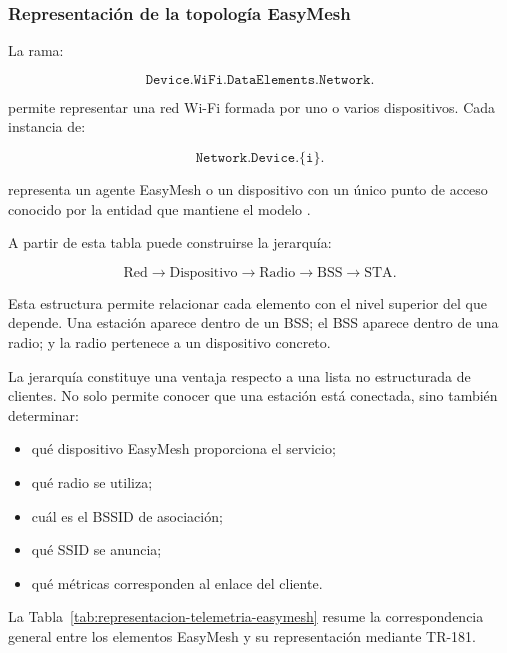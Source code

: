 \subsubsection*{Representación de la topología EasyMesh}

La rama:

\[
    \texttt{Device.WiFi.DataElements.Network.}
\]

permite representar una red Wi-Fi formada por uno o varios dispositivos.
Cada instancia de:

\[
    \texttt{Network.Device.\{i\}.}
\]

representa un agente EasyMesh o un dispositivo con un único punto de
acceso conocido por la entidad que mantiene el modelo
\cite{bbf_tr181}.

A partir de esta tabla puede construirse la jerarquía:

\[
    \text{Red}
    \longrightarrow
    \text{Dispositivo}
    \longrightarrow
    \text{Radio}
    \longrightarrow
    \text{BSS}
    \longrightarrow
    \text{STA}.
\]

Esta estructura permite relacionar cada elemento con el nivel superior
del que depende. Una estación aparece dentro de un BSS; el BSS aparece
dentro de una radio; y la radio pertenece a un dispositivo concreto.

La jerarquía constituye una ventaja respecto a una lista no estructurada
de clientes. No solo permite conocer que una estación está conectada,
sino también determinar:

\begin{itemize}
    \item qué dispositivo EasyMesh proporciona el servicio;
    \item qué radio se utiliza;
    \item cuál es el BSSID de asociación;
    \item qué SSID se anuncia;
    \item qué métricas corresponden al enlace del cliente.
\end{itemize}

La Tabla~\ref{tab:representacion-telemetria-easymesh} resume la
correspondencia general entre los elementos EasyMesh y su representación
mediante TR-181.

